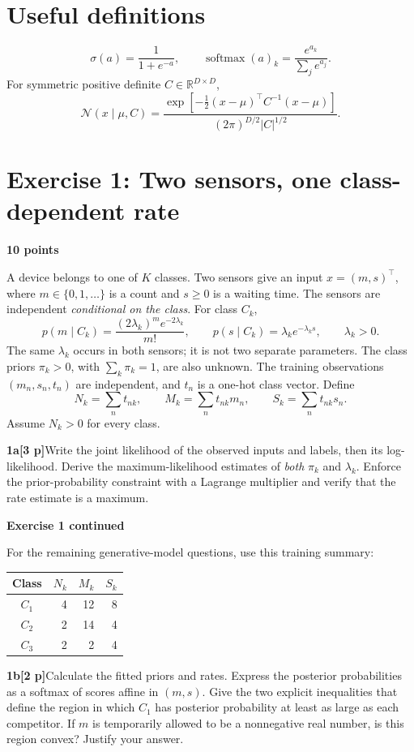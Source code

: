 \documentclass[11pt,a4paper]{article}
\newcommand{\R}{\mathbb R}
\newcommand{\question}[3]{\par\medskip\noindent\textbf{#1}\quad\textbf{[#2 p]}\quad #3\par}
\newcommand{\answerbox}[1]{\par\smallskip\noindent\fcolorbox{rulegray}{white}{\parbox[t][#1][t]{\dimexpr\linewidth-2\fboxsep-2\fboxrule\relax}{\vspace{1mm}}}\par}
\newcommand{\exercise}[3]{\section*{\color{examblue}Exercise #1: #2}\textbf{#3}\par}
\begin{document}
\section*{Useful definitions}
\[
\sigma(a)=\frac{1}{1+e^{-a}},\qquad
\operatorname{softmax}(a)_k=\frac{e^{a_k}}{\sum_j e^{a_j}}.
\]
For symmetric positive definite $C\in\R^{D\times D}$,
\[
\mathcal N(x\mid\mu,C)=\frac{\exp[-\tfrac12(x-\mu)^\top C^{-1}(x-\mu)]}
{(2\pi)^{D/2}|C|^{1/2}}.
\]

\newpage
\exercise{1}{Two sensors, one class-dependent rate}{10 points}
A device belongs to one of $K$ classes. Two sensors give an input
$x=(m,s)^\top$, where $m\in\{0,1,\ldots\}$ is a count and $s\geq0$ is a waiting time.
The sensors are independent \emph{conditional on the class}. For class $C_k$,
\[
p(m\mid C_k)=\frac{(2\lambda_k)^m e^{-2\lambda_k}}{m!},\qquad
p(s\mid C_k)=\lambda_k e^{-\lambda_k s},\qquad \lambda_k>0.
\]
The same $\lambda_k$ occurs in both sensors; it is not two separate parameters.
The class priors $\pi_k>0$, with $\sum_k\pi_k=1$, are also unknown.
The training observations $(m_n,s_n,t_n)$ are independent, and $t_n$ is a
one-hot class vector. Define
\[
N_k=\sum_n t_{nk},\qquad M_k=\sum_n t_{nk}m_n,\qquad
S_k=\sum_n t_{nk}s_n.
\]
Assume $N_k>0$ for every class.

\question{1a}{3}{Write the joint likelihood of the observed inputs and labels, then its log-likelihood. Derive the maximum-likelihood estimates of \emph{both} $\pi_k$ and $\lambda_k$. Enforce the prior-probability constraint with a Lagrange multiplier and verify that the rate estimate is a maximum.}
\answerbox{10.0cm}

\newpage
\textbf{Exercise 1 continued}

For the remaining generative-model questions, use this training summary:
\begin{center}
\begin{tabular}{crrr}
\toprule
Class & $N_k$ & $M_k$ & $S_k$\\
\midrule
$C_1$ & 4 & 12 & 8\\
$C_2$ & 2 & 14 & 4\\
$C_3$ & 2 & 2 & 4\\
\bottomrule
\end{tabular}
\end{center}

\question{1b}{2}{Calculate the fitted priors and rates. Express the posterior probabilities as a softmax of scores affine in $(m,s)$. Give the two explicit inequalities that define the region in which $C_1$ has posterior probability at least as large as each competitor. If $m$ is temporarily allowed to be a nonnegative real number, is this region convex? Justify your answer.}
\answerbox{7.0cm}
\end{document}

